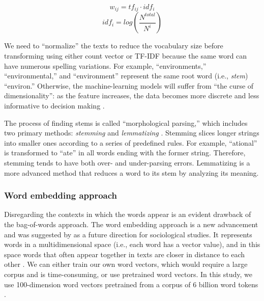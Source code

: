 \documentclass[11pt]{article}
\begin{document}
\begin{equation} \label{eq:tfidf}
 w_{ij} = tf_{ij} \cdot idf_i 
\end{equation}
\begin{equation} \label{eq:idf}
idf_i = log(\frac{N^{total}}{N^{i}})
\end{equation}

We need to ``normalize'' the texts to reduce the vocabulary size before transforming using either count vector or TF-IDF because the same word can have numerous spelling variations. For example, ``environments,'' ``environmental,'' and ``environment'' represent the same root word (i.e., \textit{stem}) ``environ.'' Otherwise, the machine-learning models will suffer from ``the curse of dimensionality'': as the feature increases, the data becomes more discrete and less informative to decision making \parencite[94]{BellmanAdaptiveControlProcesses2015}. 

The process of finding stems is called ``morphological parsing,'' which includes two primary methods: \textit{stemming} and \textit{lemmatizing} \parencite[25]{JurafskySpeechLanguageProcessing2017}. Stemming slices longer strings into smaller ones according to a series of predefined rules. For example, ``ational'' is transformed to ``ate'' in all words ending with the former string. Therefore, stemming tends to have both over- and under-parsing errors. Lemmatizing is a more advanced method that reduces a word to its stem by analyzing its meaning.

\subsubsection{Word embedding approach}

Disregarding the contexts in which the words appear is an evident drawback of the bag-of-words approach. The word embedding approach is a new advancement \parencite{MikolovEfficientEstimationWord2013} and was suggested by \textcite[28]{NelsonFutureCodingComparison2018} as a future direction for sociological studies. It represents words in a multidimensional space (i.e., each word has a vector value), and in this space words that often appear together in texts are closer in distance to each other \parencites[][290]{JurafskySpeechLanguageProcessing2017}[][65]{BengfortAppliedTextAnalysis2018}. We can either train our own word vectors, which would require a large corpus and is time-consuming, or use pretrained word vectors. In this study, we use 100-dimension word vectors pretrained from a corpus of 6 billion word tokens \parencite{PenningtonGloveGlobalVectors2014}.
\end{document}

